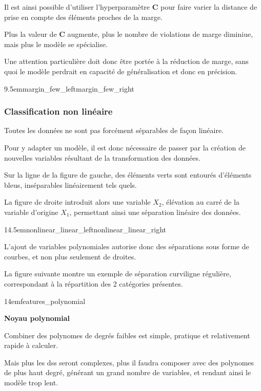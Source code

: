 Il est ainsi possible d’utiliser l’hyperparamètre \textbf{C} pour faire
varier la distance de prise en compte des éléments proches de la marge.

Plus la valeur de \textbf{C} augmente, plus le nombre de violations de
marge diminiue, mais plus le modèle se spécialise.

Une attention particulière doit donc être portée à la réduction de marge,
sans quoi le modèle perdrait en capacité de généralisation
et donc en précision.

{9.5em}{margin_few_left}{margin_few_right}

\pagebreak

\subsubsection{Classification non linéaire}

Toutes les données ne sont pas forcément séparables de façon linéaire.

Pour y adapter un modèle, il est donc nécessaire de passer par la création
de nouvelles variables résultant de la transformation des données.

Sur la ligne de la figure de gauche, des éléments verts sont entourés d’éléments bleus, inséparables linéairement tels quels.

La figure de droite introduit alors une variable $X_{2}$, élévation
au carré de la variable d’origine $X_{1}$, permettant ainsi
une séparation linéaire des données.

{14.5em}{nonlinear_linear_left}{nonlinear_linear_right}

L’ajout de variables polynomiales autorise donc des séparations sous
forme de courbes, et non plus seulement de droites.

La figure suivante montre un exemple de séparation curviligne régulière,
correspondant à la répartition des 2 catégories présentes.

{14em}{features_polynomial}

\pagebreak

\textbf{Noyau polynomial}

Combiner des polynomes de degrés faibles est simple, pratique et
relativement rapide à calculer.

Mais plus les \glspl{ds} seront complexes, plus il faudra composer avec
des polynomes de plus haut degré, générant un grand nombre de variables,
et rendant ainsi le modèle trop lent.

